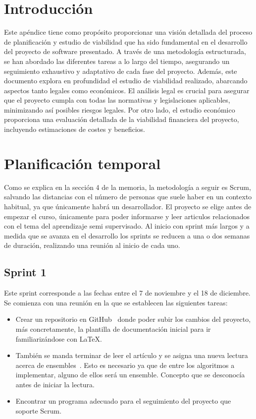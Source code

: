 
\section{Introducción}
Este apéndice tiene como propósito proporcionar una visión detallada del proceso de planificación y estudio de viabilidad que ha sido fundamental en el desarrollo del proyecto de software presentado. A través de una metodología estructurada, se han abordado las diferentes tareas a lo largo del tiempo, asegurando un seguimiento exhaustivo y adaptativo de cada fase del proyecto.
Además, este documento explora en profundidad el estudio de viabilidad realizado, abarcando aspectos tanto legales como económicos. El análisis legal es crucial para asegurar que el proyecto cumpla con todas las normativas y legislaciones aplicables, minimizando así posibles riesgos legales. Por otro lado, el estudio económico proporciona una evaluación detallada de la viabilidad financiera del proyecto, incluyendo estimaciones de costes y beneficios.

\section{Planificación temporal}
Como se explica en la sección 4 de la memoria, la metodología a seguir es Scrum, salvando las distancias con el número de personas que suele haber en un contexto habitual, ya que únicamente habrá un desarrollador.
El proyecto se elige antes de empezar el curso, únicamente para poder informarse y leer articulos relacionados con el tema del aprendizaje semi supervisado. Al inicio con sprint más largos y a medida que se avanza en el desarrollo los sprints se reducen a una o dos semanas de duración, realizando una reunión al inicio de cada uno.


\subsection{Sprint 1}
Este sprint corresponde a las fechas entre el 7 de noviembre y el 18 de diciembre. Se comienza con una reunión en la que se establecen las siguientes tareas:\\
\begin{itemize}
	\item Crear un repositorio en GitHub~\cite{Repo:Github} donde poder subir los cambios del proyecto, más concretamente, la plantilla de documentación inicial para ir familiarizándose con \LaTeX.
	\item También se manda terminar de leer el artículo \cite{Engelen:semi-supervised} y se asigna una nueva lectura acerca de ensembles~\cite{ensembles}. Esto es necesario ya que de entre los algoritmos a implementar, alguno de ellos será un ensemble. Concepto que se desconocía antes de iniciar la lectura.
	\item Encontrar un programa adecuado para el seguimiento del proyecto que soporte Scrum.
\end{itemize}

